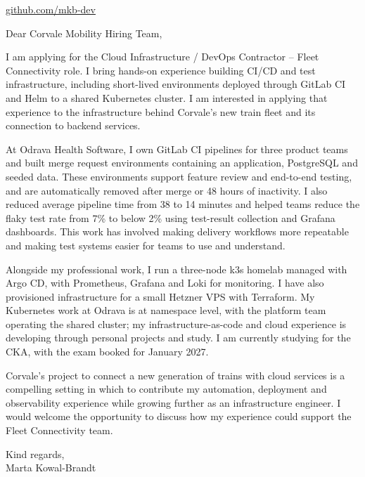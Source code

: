 \documentclass[11pt,a4paper]{article}
\begin{document}
\color{primarycolor}
\href{https://github.com/mkb-dev}{github.com/mkb-dev}

Dear Corvale Mobility Hiring Team,

I am applying for the Cloud Infrastructure / DevOps Contractor -- Fleet Connectivity role. I bring hands-on experience building CI/CD and test infrastructure, including short-lived environments deployed through GitLab CI and Helm to a shared Kubernetes cluster. I am interested in applying that experience to the infrastructure behind Corvale's new train fleet and its connection to backend services.

At Odrava Health Software, I own GitLab CI pipelines for three product teams and built merge request environments containing an application, PostgreSQL and seeded data. These environments support feature review and end-to-end testing, and are automatically removed after merge or 48 hours of inactivity. I also reduced average pipeline time from 38 to 14 minutes and helped teams reduce the flaky test rate from 7\% to below 2\% using test-result collection and Grafana dashboards. This work has involved making delivery workflows more repeatable and making test systems easier for teams to use and understand.

Alongside my professional work, I run a three-node k3s homelab managed with Argo CD, with Prometheus, Grafana and Loki for monitoring. I have also provisioned infrastructure for a small Hetzner VPS with Terraform. My Kubernetes work at Odrava is at namespace level, with the platform team operating the shared cluster; my infrastructure-as-code and cloud experience is developing through personal projects and study. I am currently studying for the CKA, with the exam booked for January 2027.

Corvale's project to connect a new generation of trains with cloud services is a compelling setting in which to contribute my automation, deployment and observability experience while growing further as an infrastructure engineer. I would welcome the opportunity to discuss how my experience could support the Fleet Connectivity team.

Kind regards,\\
Marta Kowal-Brandt
\end{document}
